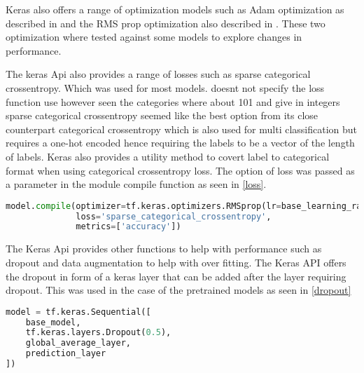     
    Keras also offers a range of optimization models such as Adam optimization as described in \citep{kingma2014adam} \citep{ruder2016overview} and the RMS prop optimization also described in \citep{ruder2016overview}. These two optimization where tested against some models to explore changes in performance.
    
    The keras Api also provides a range of losses such as sparse categorical crossentropy. Which was used for most models. \citep{KarpathyCVPR14} doesnt not specify the loss function use however seen the categories where about 101 and give in integers sparse categorical crossentropy seemed like the best option from its close counterpart categorical crossentropy which is also used for multi classification but requires a one-hot encoded hence requiring the labels to be a vector of the length of labels. Keras also provides a utility method to covert label to categorical format when using categorical crossentropy loss. The option of loss was  passed as a parameter in the module compile function as seen in \ref{loss}. 
    
    \begin{lstlisting}[language=Python, caption=Compiling model with  sparse categorical crossentropy loss , label=loss]
    model.compile(optimizer=tf.keras.optimizers.RMSprop(lr=base_learning_rate),
              loss='sparse_categorical_crossentropy',
              metrics=['accuracy'])
      \end{lstlisting}          
    
    
    The Keras Api provides other functions to help with performance such as dropout and data augmentation to help with over fitting. The Keras API offers the dropout in form of a keras layer that can be added after the layer requiring dropout. This was used in the case of the pretrained models as seen in \ref{dropout}
    
    \begin{lstlisting}[language=Python, caption=Application of dropout to pretrained models, label=dropout]
    model = tf.keras.Sequential([
    base_model,
    tf.keras.layers.Dropout(0.5),
    global_average_layer,
    prediction_layer
])
  \end{lstlisting}

